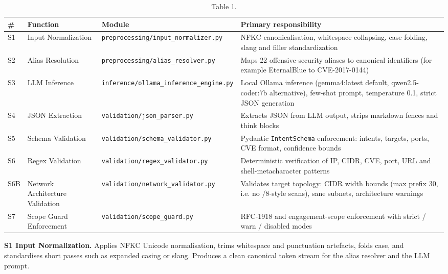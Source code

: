 \documentclass[10pt,journal,onecolumn]{IEEEtran}
\begin{document}
\begin{table}[h]
\caption{Table 1.}
\label{tab:t1}
\begin{tabularx}{\columnwidth}{l >{\raggedright\arraybackslash}X >{\raggedright\arraybackslash}X >{\raggedright\arraybackslash}X}
\toprule
\textbf{\#} & \textbf{Function} & \textbf{Module} & \textbf{Primary responsibility}\\
\midrule
S1 & Input Normalization & \texttt{preprocessing/\allowbreak input\_\allowbreak normalizer.\allowbreak py} & NFKC canonicalisation, whitespace collapsing, case folding, slang and filler standardization\\
S2 & Alias Resolution & \texttt{preprocessing/\allowbreak alias\_\allowbreak resolver.\allowbreak py} & Maps 22 offensive-security aliases to canonical identifiers (for example EternalBlue to CVE-2017-0144)\\
S3 & LLM Inference & \texttt{inference/\allowbreak ollama\_\allowbreak inference\_\allowbreak engine.\allowbreak py} & Local Ollama inference (gemma4:latest default, qwen2.5-coder:7b alternative), few-shot prompt, temperature 0.1, strict JSON generation\\
S4 & JSON Extraction & \texttt{validation/\allowbreak json\_\allowbreak parser.\allowbreak py} & Extracts JSON from LLM output, strips markdown fences and think blocks\\
S5 & Schema Validation & \texttt{validation/\allowbreak schema\_\allowbreak validator.\allowbreak py} & Pydantic \texttt{IntentSchema} enforcement: intents, targets, ports, CVE format, confidence bounds\\
S6 & Regex Validation & \texttt{validation/\allowbreak regex\_\allowbreak validator.\allowbreak py} & Deterministic verification of IP, CIDR, CVE, port, URL and shell-metacharacter patterns\\
S6B & Network Architecture Validation & \texttt{validation/\allowbreak network\_\allowbreak validator.\allowbreak py} & Validates target topology: CIDR width bounds (max prefix 30, i.e. no /8-style scans), sane subnets, architecture warnings\\
S7 & Scope Guard Enforcement & \texttt{validation/\allowbreak scope\_\allowbreak guard.\allowbreak py} & RFC-1918 and engagement-scope enforcement with strict / warn / disabled modes\\
\bottomrule
\end{tabularx}
\end{table}

\textbf{S1 Input Normalization.} Applies NFKC Unicode normalisation, trims whitespace and punctuation artefacts, folds case, and standardises short passes such as expanded casing or slang. Produces a clean canonical token stream for the alias resolver and the LLM prompt.
\end{document}
